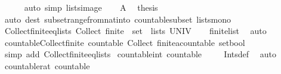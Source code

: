 \begin{isabellebody}
\ \ \ \ \isamarkupfalse%
\ {\isacharparenleft}auto\ simp{\isacharcolon}\ lists{\isacharunderscore}image{\isacharparenright}\isanewline
\ \ \isamarkupfalse%
\ A\ \isamarkupfalse%
\ {\isacharquery}thesis\isanewline
\ \ \ \ \isamarkupfalse%
\ {\isacharparenleft}auto\ dest{\isacharcolon}\ subset{\isacharunderscore}range{\isacharunderscore}from{\isacharunderscore}nat{\isacharunderscore}into\ countable{\isacharunderscore}subset\ lists{\isacharunderscore}mono{\isacharparenright}\isanewline
{}\isamarkupfalse%
%
\endisatagproof
{\isafoldproof}%
%
\isadelimproof
\isanewline
%
\endisadelimproof
\isanewline
{}\isamarkupfalse%
\ Collect{\isacharunderscore}finite{\isacharunderscore}eq{\isacharunderscore}lists{\isacharcolon}\ {\isachardoublequoteopen}Collect\ finite\ {\isacharequal}\ set\ {\isacharbackquote}\ lists\ UNIV{\isachardoublequoteclose}\isanewline
%
\isadelimproof
\ \ %
\endisadelimproof
%
\isatagproof
{}\isamarkupfalse%
\ finite{\isacharunderscore}list\ \isamarkupfalse%
\ auto%
\endisatagproof
{\isafoldproof}%
%
\isadelimproof
\isanewline
%
\endisadelimproof
\isanewline
{}\isamarkupfalse%
\ countable{\isacharunderscore}Collect{\isacharunderscore}finite{\isacharcolon}\ {\isachardoublequoteopen}countable\ {\isacharparenleft}Collect\ {\isacharparenleft}finite{\isacharcolon}{\isacharcolon}{\isacharprime}a{\isacharcolon}{\isacharcolon}countable\ set{\isasymRightarrow}bool{\isacharparenright}{\isacharparenright}{\isachardoublequoteclose}\isanewline
%
\isadelimproof
\ \ %
\endisadelimproof
%
\isatagproof
{}\isamarkupfalse%
\ {\isacharparenleft}simp\ add{\isacharcolon}\ Collect{\isacharunderscore}finite{\isacharunderscore}eq{\isacharunderscore}lists{\isacharparenright}%
\endisatagproof
{\isafoldproof}%
%
\isadelimproof
\isanewline
%
\endisadelimproof
\isanewline
{}\isamarkupfalse%
\ countable{\isacharunderscore}int{\isacharcolon}\ {\isachardoublequoteopen}countable\ {\isasymint}{\isachardoublequoteclose}\isanewline
%
\isadelimproof
\ \ %
\endisadelimproof
%
\isatagproof
{}\isamarkupfalse%
\ Ints{\isacharunderscore}def\ \isamarkupfalse%
\ auto%
\endisatagproof
{\isafoldproof}%
%
\isadelimproof
\isanewline
%
\endisadelimproof
\isanewline
{}\isamarkupfalse%
\ countable{\isacharunderscore}rat{\isacharcolon}\ {\isachardoublequoteopen}countable\ {\isasymrat}{\isachardoublequoteclose}\isanewline
%
\isadelimproof
\ \ %
\endisadelimproof
%
\isatagproof
{}\isamarkupfalse%

\end{isabellebody}
